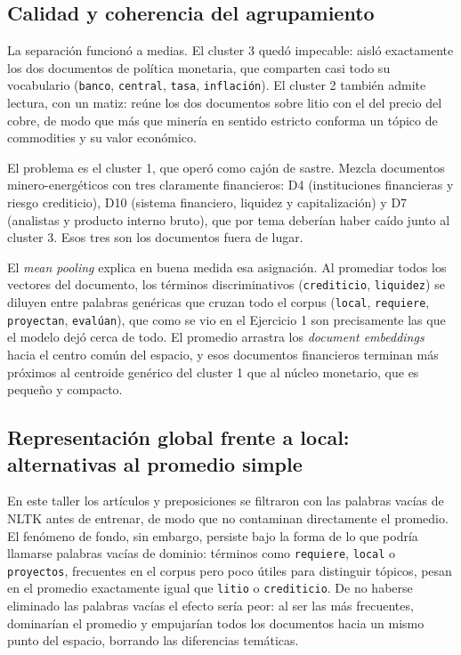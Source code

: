 \documentclass[12pt, a4paper]{article}
\newcommand{\code}[1]{\texttt{#1}}
\begin{document}
\subsection{Calidad y coherencia del agrupamiento}

La separación funcionó a medias. El cluster 3 quedó impecable: aisló exactamente los dos documentos
de política monetaria, que comparten casi todo su vocabulario (\code{banco}, \code{central},
\code{tasa}, \code{inflación}). El cluster 2 también admite lectura, con un matiz: reúne los dos
documentos sobre litio con el del precio del cobre, de modo que más que minería en sentido estricto
conforma un tópico de commodities y su valor económico.

El problema es el cluster 1, que operó como cajón de sastre. Mezcla documentos minero-energéticos con
tres claramente financieros: D4 (instituciones financieras y riesgo crediticio), D10 (sistema
financiero, liquidez y capitalización) y D7 (analistas y producto interno bruto), que por tema
deberían haber caído junto al cluster 3. Esos tres son los documentos fuera de lugar.

El \textit{mean pooling} explica en buena medida esa asignación. Al promediar todos los vectores del
documento, los términos discriminativos (\code{crediticio}, \code{liquidez}) se diluyen entre
palabras genéricas que cruzan todo el corpus (\code{local}, \code{requiere}, \code{proyectan},
\code{evalúan}), que como se vio en el Ejercicio 1 son precisamente las que el modelo dejó cerca de
todo. El promedio arrastra los \textit{document embeddings} hacia el centro común del espacio, y esos
documentos financieros terminan más próximos al centroide genérico del cluster 1 que al núcleo
monetario, que es pequeño y compacto.

\subsection{Representación global frente a local: alternativas al promedio simple}

En este taller los artículos y preposiciones se filtraron con las palabras vacías de NLTK antes de
entrenar, de modo que no contaminan directamente el promedio. El fenómeno de fondo, sin embargo,
persiste bajo la forma de lo que podría llamarse palabras vacías de dominio: términos como
\code{requiere}, \code{local} o \code{proyectos}, frecuentes en el corpus pero poco útiles para
distinguir tópicos, pesan en el promedio exactamente igual que \code{litio} o \code{crediticio}. De
no haberse eliminado las palabras vacías el efecto sería peor: al ser las más frecuentes, dominarían
el promedio y empujarían todos los documentos hacia un mismo punto del espacio, borrando las
diferencias temáticas.
\end{document}
